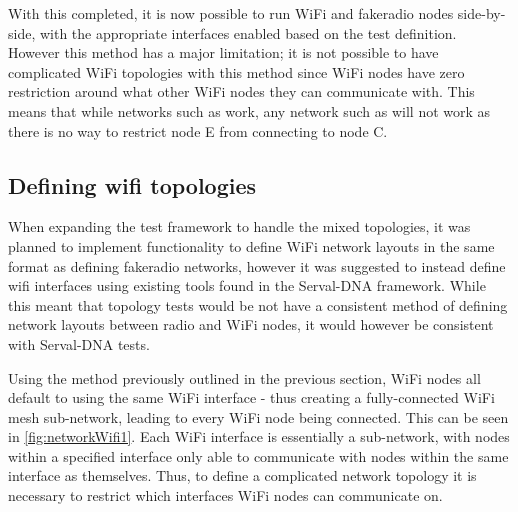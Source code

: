 With this completed, it is now possible to run WiFi and fakeradio nodes side-by-side, with the appropriate interfaces enabled based on the test definition.
However this method has a major limitation; it is not possible to have complicated WiFi topologies with this method since WiFi nodes have zero restriction around what other WiFi nodes they can communicate with.
This means that while networks such as  work, any network such as  will not work as there is no way to restrict node E from connecting to node C.



\subsection{Defining wifi topologies}
When expanding the test framework to handle the mixed topologies, it was planned to implement functionality to define WiFi network layouts in the same format as defining fakeradio networks, however it was suggested to instead define wifi interfaces using existing tools found in the Serval-DNA framework.
While this meant that topology tests would be not have a consistent method of defining network layouts between radio and WiFi nodes, it would however be consistent with Serval-DNA tests.

Using the method previously outlined in the previous section, WiFi nodes all default to using the same WiFi interface - thus creating a fully-connected WiFi mesh sub-network, leading to every WiFi node being connected. 
This can be seen in \figurename{ \ref{fig:networkWifi1}}.
Each WiFi interface is essentially a sub-network, with nodes within a specified interface only able to communicate with nodes within the same interface as themselves.
Thus, to define a complicated network topology it is necessary to restrict which interfaces WiFi nodes can communicate on.

